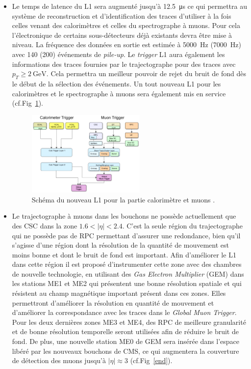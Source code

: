 \begin{itemize}[label=$\bullet$]
	\item Le temps de latence du L1 sera augmenté jusqu'à \SI{12.5}{\micro\second} ce qui permettra au système de reconstruction et d'identification des traces d'utiliser à la fois celles venant des calorimètres et celles du spectrographe à muons. Pour cela l'électronique de certains sous-détecteurs déjà existants devra être mise à niveau. La fréquence des données en sortie est estimée à \SI{5000}{\hertz} (\SI{7000}{\hertz}) avec \num{140} (\num{200}) événements de \textit{pile-up}. Le \textit{trigger} L1 aura également les informations des traces fournies par le trajectographe pour des traces avec $p_{T}\geq\SI{2}{\giga\eV}$. Cela permettra un meilleur pouvoir de rejet du bruit de fond dès le début de la sélection des événements. Un tout nouveau L1 pour les calorimètres et le spectrographe à muons sera également mis en service (cf.Fig~\ref{L1_2}).
	\begin{figure}[ht!]
		\centering
		\includegraphics[width=0.55\textwidth]{CMS/L1_2.png}
		\captionsetup{type=figure}\caption{Schéma du nouveau L1 pour la partie calorimètre et muons \cite{1748-0221-11-02-C02029}.}
		\label{L1_2}
	\end{figure}
\item Le trajectographe à muons dans les bouchons ne possède actuellement que des CSC dans la zone $\num{1.6}<|\eta|<\num{2.4}$. C'est la seule région du trajectographe qui ne possède pas de RPC permettant d'assurer une redondance, bien qu'il s'agisse d'une région dont la résolution de la quantité de mouvement est moins bonne et dont le bruit de fond est important. Afin d'améliorer le L1 dans cette région il est proposé d'instrumenter cette zone avec des chambres de nouvelle technologie, en utilisant des \textit{Gas Electron Multiplier} (GEM) dans les stations ME1 et ME2 qui présentent une bonne résolution spatiale et qui résistent au champ magnétique important présent dans ces zones. Elles permettront d'améliorer la résolution en quantité de mouvement et d'améliorer la correspondance avec les traces dans le \textit{Global Muon Trigger}. Pour les deux dernières zones ME3 et ME4, des RPC de meilleure granularité et de bonne résolution temporelle seront utilisées afin de réduire le bruit de fond.  De plus, une nouvelle station ME0 de GEM sera insérée dans l'espace libéré par les nouveaux bouchons de CMS, ce qui augmentera la couverture de détection des muons jusqu'à $|\eta|\approx\num{3}$ (cf.Fig~\ref{end}). 

\end{itemize}
